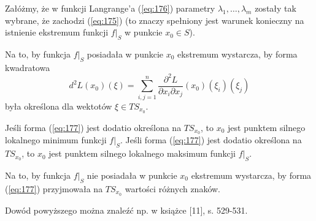 \documentclass[leqno]{article}
\begin{document}
\begin{justify}
\begin{theorem}
    Załóżmy, że w funkcji Langrange'a (\ref{eq:176}) parametry $\lambda_1, \ldots, \lambda_m$ zostały tak wybrane, że zachodzi (\ref{eq:175})
    (to znaczy spełniony jest warunek konieczny na istnienie ekstremum funkcji $f|_S$ w punkcie $x_0 \in S$).

    Na to, by funkcja $f|_S$ posiadała w punkcie $x_0$ ekstremum wystarcza, by forma kwadratowa
    \begin{equation}\label{eq:177}
        d^2 L(x_0)(\xi) = \sum_{i,j=1}^{n}\frac{\partial ^2 L}{\partial x_i \partial x_j}(x_0)(\xi_i)(\xi_j)
    \end{equation}
    była określona dla wektotów $\xi \in TS_{x_0}$. 

    Jeśli forma (\ref{eq:177}) jest dodatio określona na $TS_{x_0}$, to $x_0$ jest punktem silnego lokalnego minimum funkcji $f|_S$.
    Jeśli forma (\ref{eq:177}) jest dodatio określona na $TS_{x_0}$, to $x_0$ jest punktem silnego lokalnego maksimum funkcji $f|_S$.

    Na to, by funkcja $f|_S$ nie posiadała w punkcie $x_0$ ekstremum wystarcza, by forma (\ref{eq:177}) przyjmowała na $TS_{x_0}$ wartości różnych znaków.
\end{theorem}

Dowód powyższego można znaleźć np. w książce [11], s. 529-531.


\end{justify}
\end{document}

